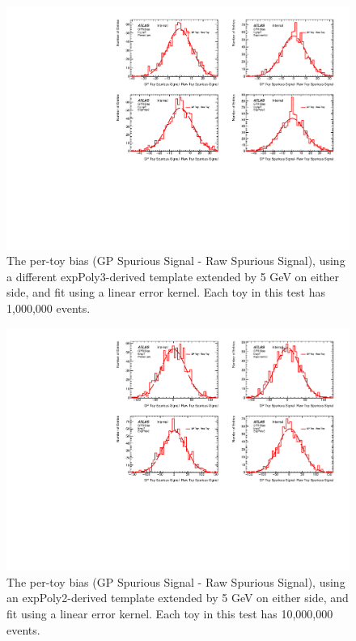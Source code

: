 \begin{figure} 
\begin{center}
  \includegraphics[width=\textwidth]{figures/background/gpr/validation/linear/ToyTest_FitSigBiases_highpT_1M_noSig}   
\caption{The per-toy bias (GP Spurious Signal - Raw Spurious Signal), using a different expPoly3-derived template extended by 5 GeV on either side, and fit using a linear error kernel. Each toy in this test has 1,000,000 events.}
\label{fig:bias_linearkernel_highpt_1M_noSig}
\end{center}
\end{figure}

\begin{figure} 
\begin{center}
  \includegraphics[width=\textwidth]{figures/background/gpr/validation/linear/ToyTest_FitSigBiases_lowpT_10M_noSig}   
\caption{The per-toy bias (GP Spurious Signal - Raw Spurious Signal), using an expPoly2-derived template extended by 5 GeV on either side, and fit using a linear error kernel. Each toy in this test has 10,000,000 events.}
\label{fig:bias_linearkernel_lowpt_10M_noSig}
\end{center}
\end{figure}

